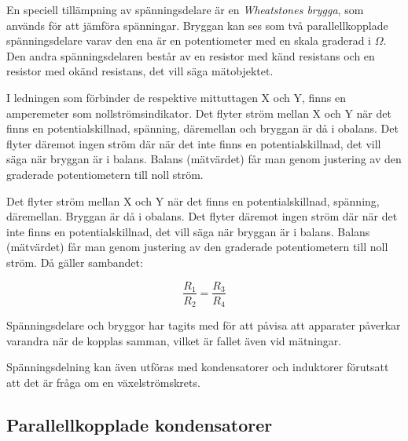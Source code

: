 En speciell tillämpning av spänningsdelare är en \emph{Wheatstones brygga},
som används för att jämföra spänningar.
Bryggan kan ses som två parallellkopplade spänningsdelare varav den ena är en
potentiometer med en skala graderad i \(\Omega\).
Den andra spänningsdelaren består av en resistor med känd resistans och en
resistor med okänd resistans, det vill säga mätobjektet.

I ledningen som förbinder de respektive mittuttagen X och Y, finns en
amperemeter som nollströmsindikator.
Det flyter ström mellan X och Y när det finns en potentialskillnad,
spänning, däremellan och bryggan är då i obalans.
Det flyter däremot ingen ström där när det inte finns en
potentialskillnad, det vill säga när bryggan är i balans.
Balans (mätvärdet) får man genom justering av den graderade
potentiometern till noll ström.

Det flyter ström mellan X och Y när det finns en potentialskillnad, spänning, däremellan.
Bryggan är då i obalans.
Det flyter däremot ingen ström där när det inte finns en potentialskillnad,
det vill säga när bryggan är i balans.
Balans (mätvärdet) får man genom justering av den graderade potentiometern
till noll ström.
Då gäller sambandet: 

\[ \frac{R_1}{R_2} = \frac{R_3}{R_4} \]

Spänningsdelare och bryggor har tagits med för att påvisa att apparater
påverkar varandra när de kopplas samman, vilket är fallet även vid mätningar.

Spänningsdelning kan även utföras med kondensatorer och induktorer förutsatt
att det är fråga om en växelströmskrets.

\subsection{Parallellkopplade kondensatorer}

